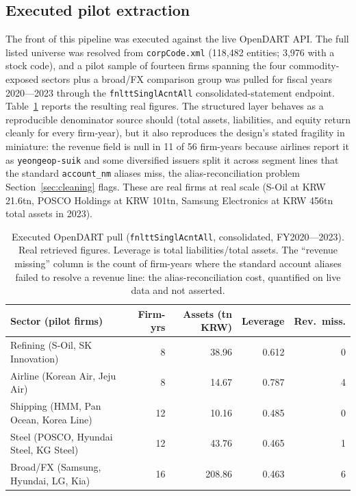 \documentclass[11pt,a4paper]{article}
\begin{document}
\subsection{Executed pilot extraction}
\label{sec:pilot}

The front of this pipeline was executed against the live OpenDART API. The full listed universe was resolved from \texttt{corpCode.xml} (118{,}482 entities; 3{,}976 with a stock code), and a pilot sample of fourteen firms spanning the four commodity-exposed sectors plus a broad/FX comparison group was pulled for fiscal years 2020---2023 through the \texttt{fnlttSinglAcntAll} consolidated-statement endpoint. Table~\ref{tab:realpanel} reports the resulting real figures. The structured layer behaves as a reproducible denominator source should (total assets, liabilities, and equity return cleanly for every firm-year), but it also reproduces the design's stated fragility in miniature: the revenue field is null in 11 of 56 firm-years because airlines report it as \texttt{yeongeop-suik} and some diversified issuers split it across segment lines that the standard \texttt{account\_nm} aliases miss, the alias-reconciliation problem Section~\ref{sec:cleaning} flags. These are real firms at real scale (S-Oil at KRW 21.6tn, POSCO Holdings at KRW 101tn, Samsung Electronics at KRW 456tn total assets in 2023).

\begin{table}[h]
\centering
\setlength{\tabcolsep}{3.4pt}
\begin{tabular}{lrrrr}
\toprule
Sector (pilot firms) & Firm-yrs & Assets (tn KRW) & Leverage & Rev.\ miss. \\
\midrule
Refining (S-Oil, SK Innovation)     & 8  & 38.96  & 0.612 & 0 \\
Airline (Korean Air, Jeju Air)      & 8  & 14.67  & 0.787 & 4 \\
Shipping (HMM, Pan Ocean, Korea Line) & 12 & 10.16  & 0.485 & 0 \\
Steel (POSCO, Hyundai Steel, KG Steel) & 12 & 43.76  & 0.465 & 1 \\
Broad/FX (Samsung, Hyundai, LG, Kia) & 16 & 208.86 & 0.463 & 6 \\
\bottomrule
\end{tabular}
\caption{Executed OpenDART pull (\texttt{fnlttSinglAcntAll}, consolidated, FY2020---2023). Real retrieved figures. Leverage is total liabilities/total assets. The ``revenue missing'' column is the count of firm-years where the standard account aliases failed to resolve a revenue line: the alias-reconciliation cost, quantified on live data and not asserted.}
\label{tab:realpanel}
\end{table}
\end{document}
